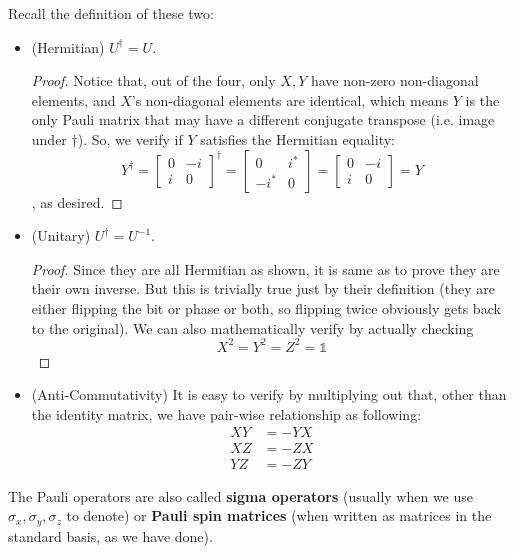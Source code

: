 \documentclass[12pt]{article}
\begin{document}
\begin{proposition}
Recall the definition of these two:
\begin{itemize}
    \item (Hermitian) $U^\dag = U$.
    \begin{proof}
        Notice that, out of the four, only $X,Y$ have non-zero non-diagonal elements, and $X$'s non-diagonal elements are identical, which means $Y$ is the only Pauli matrix that may have a different conjugate transpose (i.e. image under $\dag$). So, we verify if $Y$ satisfies the Hermitian equality: $$
        Y^\dag = \begin{bmatrix}
            0 & -i\\
            i & 0
        \end{bmatrix}^\dag
        = \begin{bmatrix}
            0 & i^*\\
            -i^* & 0
        \end{bmatrix} = \begin{bmatrix}
            0 & -i\\
            i & 0
        \end{bmatrix} = Y
        $$, as desired.
    \end{proof}
    \item (Unitary) $U^\dag = U^{-1}$.
    \begin{proof}
        Since they are all Hermitian as shown, it is same as to prove they are their own inverse. But this is trivially true just by their definition (they are either flipping the bit or phase or both, so flipping twice obviously gets back to the original). We can also mathematically verify by actually checking $$
        X^2 = Y^2 = Z^2 = \mathbb{1}
        $$
    \end{proof}
    \item (Anti-Commutativity) It is easy to verify by multiplying out that, other than the identity matrix, we have pair-wise relationship as following:$$
    \begin{aligned}
    XY &= -YX\\
    XZ &= -ZX\\
    YZ &= -ZY
    \end{aligned}
    $$
\end{itemize}
\end{proposition}

\begin{remark}
The Pauli operators are also called \textbf{sigma operators} (usually when we use $\sigma_x, \sigma_y, \sigma_z$ to denote) or \textbf{Pauli spin matrices} (when written as matrices in the standard basis, as we have done).
\end{remark}
\end{document}
